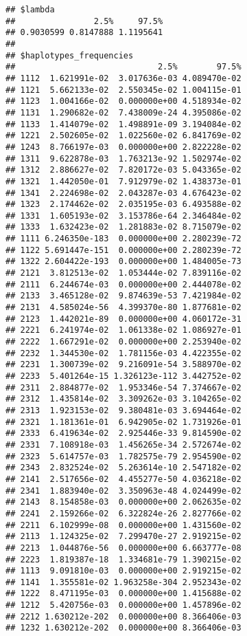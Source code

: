\documentclass[
]{article}
\begin{document}
\begin{verbatim}
## $lambda
##                2.5%     97.5% 
## 0.9030599 0.8147888 1.1195641 
## 
## $haplotypes_frequencies
##                             2.5%        97.5%
## 1112  1.621991e-02  3.017636e-03 4.089470e-02
## 1121  5.662133e-02  2.550345e-02 1.004115e-01
## 1123  1.004166e-02  0.000000e+00 4.518934e-02
## 1131  1.290682e-02  7.438009e-24 4.395086e-02
## 1133  1.414079e-02  1.498891e-09 3.194084e-02
## 1221  2.502605e-02  1.022560e-02 6.841769e-02
## 1243  8.766197e-03  0.000000e+00 2.822228e-02
## 1311  9.622878e-03  1.763213e-92 1.502974e-02
## 1312  2.886627e-02  7.820172e-03 5.043365e-02
## 1321  1.442050e-01  7.912979e-02 1.438373e-01
## 1341  2.224698e-02  2.043287e-03 4.676423e-02
## 1323  2.174462e-02  2.035195e-03 6.493588e-02
## 1331  1.605193e-02  3.153786e-64 2.346484e-02
## 1333  1.632423e-02  1.281883e-02 8.715079e-02
## 1111 6.246350e-183  0.000000e+00 2.280239e-72
## 1122 5.691447e-151  0.000000e+00 2.280239e-72
## 1322 2.604422e-193  0.000000e+00 1.484005e-73
## 2121  3.812513e-02  1.053444e-02 7.839116e-02
## 2111  6.244674e-03  0.000000e+00 2.444078e-02
## 2133  3.465128e-02  9.874639e-53 7.421984e-02
## 2131  4.585024e-56  4.399370e-80 1.877681e-02
## 2123  1.442021e-89  0.000000e+00 4.060172e-31
## 2221  6.241974e-02  1.061338e-02 1.086927e-01
## 2222  1.667291e-02  0.000000e+00 2.253940e-02
## 2232  1.344530e-02  1.781156e-03 4.422355e-02
## 2231  1.300739e-02  9.216091e-54 3.588970e-02
## 2233  5.401264e-15 1.326123e-112 3.442752e-02
## 2311  2.884877e-02  1.953346e-54 7.374667e-02
## 2312  1.435814e-02  3.309262e-03 3.104265e-02
## 2313  1.923153e-02  9.380481e-03 3.694464e-02
## 2321  1.181361e-01  6.942905e-02 1.731926e-01
## 2333  6.419634e-02  2.925446e-33 9.814590e-02
## 2331  7.108918e-03  1.456265e-34 2.572674e-02
## 2323  5.614757e-03  1.782575e-79 2.954590e-02
## 2343  2.832524e-02  5.263614e-10 2.547182e-02
## 2141  2.517656e-02  4.455277e-50 4.036218e-02
## 2341  1.883940e-02  3.350963e-48 4.024499e-02
## 2143  8.154858e-03  0.000000e+00 2.062635e-02
## 2241  2.159266e-02  6.322824e-26 2.827766e-02
## 2211  6.102999e-08  0.000000e+00 1.431560e-02
## 2113  1.124325e-02  7.299470e-27 2.919215e-02
## 2213  1.044876e-56  0.000000e+00 6.663777e-08
## 2223  1.819387e-18  1.334681e-79 1.390215e-02
## 1113  9.091810e-03  0.000000e+00 2.919215e-02
## 1141  1.355581e-02 1.963258e-304 2.952343e-02
## 1222  8.471195e-03  0.000000e+00 1.415688e-02
## 1212  5.420756e-03  0.000000e+00 1.457896e-02
## 2212 1.630212e-202  0.000000e+00 8.366406e-03
## 1232 1.630212e-202  0.000000e+00 8.366406e-03

\end{verbatim}
\end{document}

